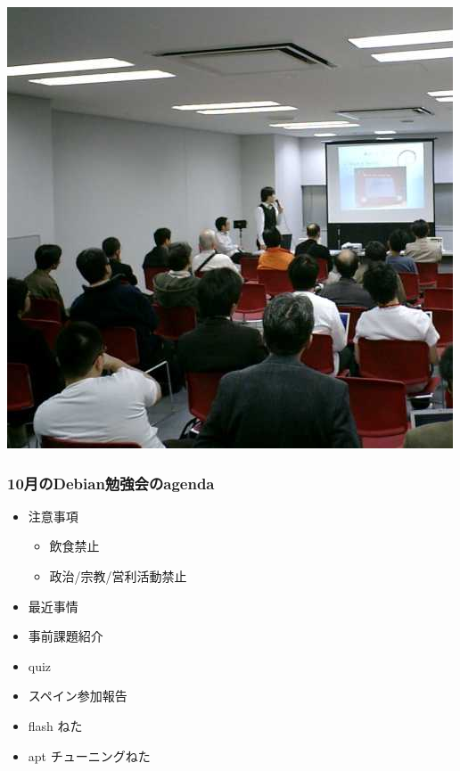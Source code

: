 \documentclass[cjk,dvipdfmx]{beamer}
\begin{document}
\begin{frame}
 \includegraphics[width=0.8\hsize]{image200611/meeting.jpg}
\end{frame}


\begin{frame}
 \frametitle{10月のDebian勉強会のagenda}
\begin{minipage}[t]{0.4\hsize}
  \begin{itemize}
  \item 注意事項
	\begin{itemize}
	 \item 飲食禁止
	 \item 政治/宗教/営利活動禁止
	\end{itemize}
  \item 最近事情
  \item 事前課題紹介
  \item quiz
 \end{itemize}
\end{minipage} 
\begin{minipage}[t]{0.4\hsize}
\begin{itemize}
  \item スペイン参加報告
  \item flash ねた
  \item apt チューニングねた
 \end{itemize}
\end{minipage}
\end{frame}
\end{document}
